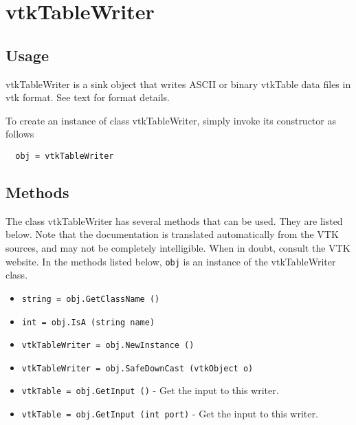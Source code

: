 \section{vtkTableWriter}

\subsection{Usage}

 vtkTableWriter is a sink object that writes ASCII or binary 
 vtkTable data files in vtk format. See text for format details.

To create an instance of class vtkTableWriter, simply
invoke its constructor as follows
\begin{verbatim}
  obj = vtkTableWriter
\end{verbatim}
\subsection{Methods}

The class vtkTableWriter has several methods that can be used.
  They are listed below.
Note that the documentation is translated automatically from the VTK sources,
and may not be completely intelligible.  When in doubt, consult the VTK website.
In the methods listed below, \verb|obj| is an instance of the vtkTableWriter class.
\begin{itemize}
\item  \verb|string = obj.GetClassName ()|

\item  \verb|int = obj.IsA (string name)|

\item  \verb|vtkTableWriter = obj.NewInstance ()|

\item  \verb|vtkTableWriter = obj.SafeDownCast (vtkObject o)|

\item  \verb|vtkTable = obj.GetInput ()| -  Get the input to this writer.

\item  \verb|vtkTable = obj.GetInput (int port)| -  Get the input to this writer.

\end{itemize}
